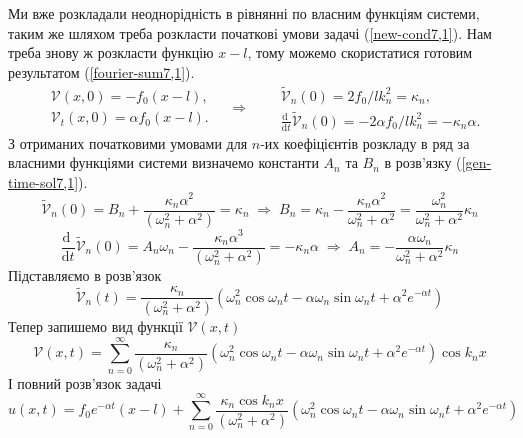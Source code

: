 Ми вже розкладали неоднорідність в рівнянні по власним функціям системи, таким же шляхом треба розкласти початкові умови задачі (\ref{new-cond7,1}). Нам треба знову ж розкласти функцію $x - l$, тому можемо скористатися готовим результатом (\ref{fourier-sum7,1}).
\begin{equation}
    \begin{aligned}
        &\mathcal{V}(x,0) = - f_0 (x-l),\\
        &\mathcal{V}_t(x,0) = \alpha f_0 (x-l).
    \end{aligned} 
    \quad\Rightarrow\quad
    \begin{aligned}
        &\widetilde{\mathcal{V}}_n(0) = 2 f_0/l k_n^2 = \kappa_n,\\
        &\frac{\mathrm{d}\;}{\mathrm{d}t}\widetilde{\mathcal{V}}_n(0) = -2\alpha f_0/lk_n^2 = -\kappa_n\alpha.
    \end{aligned} 
\end{equation}
З отриманих початковими умовами для $n$-их коефіцієнтів розкладу в ряд за власними функціями системи визначемо константи $A_n$ та $B_n$ в розв'язку (\ref{gen-time-sol7,1}). 
\begin{equation*}
    \widetilde{\mathcal{V}}_n(0) = B_n + \frac{\kappa_n\alpha^2}{(\omega_n^2 + \alpha^2)} = \kappa_n
    \;\Rightarrow\;
    B_n  = \kappa_n - \frac{\kappa_n\alpha^2}{\omega_n^2 + \alpha^2} = \frac{\omega_n^2}{\omega_n^2 + \alpha^2} \kappa_n
\end{equation*}
\begin{equation*}
    \frac{\mathrm{d}\;}{\mathrm{d}t}\widetilde{\mathcal{V}}_n(0) = A_n\omega_n - \frac{\kappa_n\alpha^3}{(\omega_n^2 + \alpha^2)} = -\kappa_n\alpha
    \;\Rightarrow\;
    A_n = -\frac{\alpha\omega_n}{\omega_n^2 + \alpha^2} \kappa_n
\end{equation*}
Підставляємо в розв'язок
\begin{equation} \label{unic-time-sol7,1}
    \widetilde{\mathcal{V}}_n(t) = \frac{\kappa_n}{(\omega_n^2 + \alpha^2)} \left(\omega_n^2\cos\omega_nt - \alpha\omega_n\sin\omega_nt +  \alpha^2e^{-\alpha t}\right)
\end{equation}  
Тепер запишемо вид функції $\mathcal{V}(x,t)$
\begin{equation}
    \mathcal{V}(x,t) = \sum_{n=0}^\infty \frac{\kappa_n}{(\omega_n^2 + \alpha^2)} \left(\omega_n^2\cos\omega_nt - \alpha\omega_n\sin\omega_nt +  \alpha^2e^{-\alpha t}\right) \cos k_n x
\end{equation}
І повний розв'язок задачі
\begin{equation} \label{Cauchy-sol7,1}
    u(x,t) = f_0 e^{-\alpha t} (x - l) +  \sum_{n=0}^\infty \frac{\kappa_n \cos k_n x}{(\omega_n^2 + \alpha^2)} \left(\omega_n^2\cos\omega_nt - \alpha\omega_n\sin\omega_nt +  \alpha^2e^{-\alpha t}\right) 
\end{equation}

%